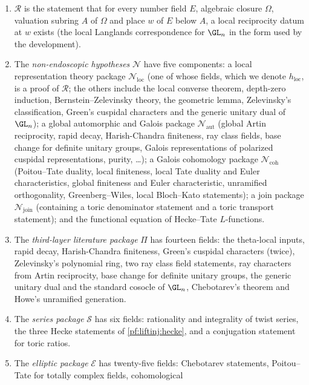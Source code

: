 \begin{definition}\label{pf:liftinj:packdef}
\begin{enumerate}[label=(\alph*)]
\item $\mathcal R$ is the statement that for every number field $E$, algebraic closure $\Omega$, valuation subring $A$ of $\Omega$ and place $w$ of $E$
below $A$, a local reciprocity datum at $w$ exists (the local Langlands correspondence for $\GL_n$ in the form used by the development).
\item The \emph{non-endoscopic hypotheses} $\mathcal N$ have five components: a local representation theory package $\mathcal N_{\mathrm{loc}}$ (one of whose
fields, which we denote $h_{\mathrm{loc}}$, is a proof of $\mathcal R$; the others include the local converse theorem, depth-zero induction, Bernstein--Zelevinsky
theory, the geometric lemma, Zelevinsky's classification, Green's cuspidal characters and the generic unitary dual of $\GL_n$); a global automorphic
and Galois package $\mathcal N_{\mathrm{aut}}$ (global Artin reciprocity, rapid decay, Harish-Chandra finiteness, ray class fields, base change for
definite unitary groups, Galois representations of polarized cuspidal representations, purity, \dots); a Galois cohomology package
$\mathcal N_{\mathrm{coh}}$ (Poitou--Tate duality, local finiteness, local Tate duality and Euler characteristics, global finiteness and Euler
characteristic, unramified orthogonality, Greenberg--Wiles, local Bloch--Kato statements); a join package $\mathcal N_{\mathrm{join}}$ (containing a
toric denominator statement and a toric transport statement); and the functional equation of Hecke--Tate $L$-functions.
\item The \emph{third-layer literature package} $\Pi$ has fourteen fields: the theta-local inputs, rapid decay, Harish-Chandra finiteness, Green's
cuspidal characters (twice), Zelevinsky's polynomial ring, two ray class field statements, ray characters from Artin reciprocity, base change for
definite unitary groups, the generic unitary dual and the standard cosocle of $\GL_n$, Chebotarev's theorem and Howe's unramified generation.
\item The \emph{series package} $\mathcal S$ has six fields: rationality and integrality of twist series, the three Hecke statements of
\cref{pf:liftinj:hecke}, and a conjugation statement for toric ratios.
\item The \emph{elliptic package} $\mathcal E$ has twenty-five fields: Chebotarev statements, Poitou--Tate for totally complex fields, cohomological

\end{enumerate}
\end{definition}
